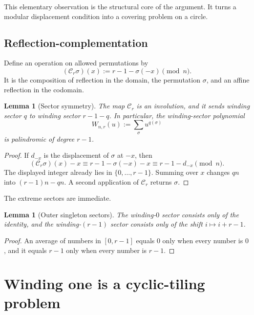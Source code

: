 \documentclass[11pt,letterpaper]{article}
\numberwithin{equation}{section}
\newtheorem{lemma}[theorem]{Lemma}
\theoremstyle{definition}
\newcommand{\calC}{\mathcal C}
\begin{document}
This elementary observation is the structural core of the argument.  It turns
a modular displacement condition into a covering problem on a circle.

\subsection{Reflection-complementation}

Define an operation on allowed permutations by
\begin{equation}\label{wdc:eq:complement-map}
  (\calC_r\sigma)(x):=r-1-\sigma(-x)\pmod n.
\end{equation}
It is the composition of reflection in the domain, the permutation $\sigma$,
and an affine reflection in the codomain.

\begin{lemma}[Sector symmetry]\label{wdc:lem:sector-symmetry}
The map $\calC_r$ is an involution, and it sends winding sector $q$ to winding
sector $r-1-q$.  In particular, the winding-sector polynomial
\begin{equation}\label{wdc:eq:sector-polynomial}
  W_{n,r}(u):=\sum_{\sigma}u^{q(\sigma)}
\end{equation}
is palindromic of degree $r-1$.
\end{lemma}

\begin{proof}
If $d_{-x}$ is the displacement of $\sigma$ at $-x$, then
\[
 (\calC_r\sigma)(x)-x
 \equiv r-1-\sigma(-x)-x
 \equiv r-1-d_{-x}\pmod n.
\]
The displayed integer already lies in $\{0,\dots,r-1\}$.  Summing over $x$
changes $qn$ into $(r-1)n-qn$.  A second application of $\calC_r$ returns
$\sigma$.
\end{proof}

The extreme sectors are immediate.

\begin{lemma}[Outer singleton sectors]\label{wdc:lem:outer-singletons}
The winding-$0$ sector consists only of the identity, and the winding-$(r-1)$
sector consists only of the shift $i\mapsto i+r-1$.
\end{lemma}

\begin{proof}
An average of numbers in $[0,r-1]$ equals $0$ only when every number is $0$,
and it equals $r-1$ only when every number is $r-1$.
\end{proof}

\section{Winding one is a cyclic-tiling problem}\label{wdc:sec:tilings}
\end{document}
